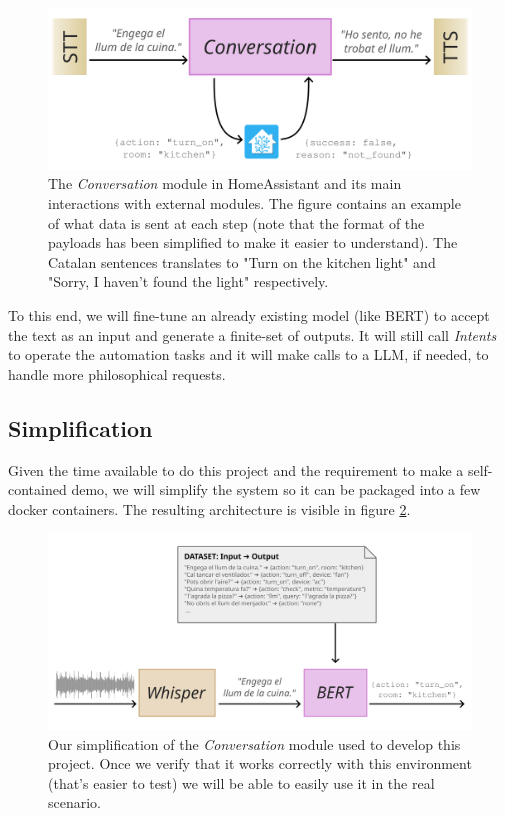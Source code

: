 \documentclass{article}
\begin{document}
\begin{figure}[H]
    \centering
    \includegraphics[width=0.95\linewidth]{drawing1.png}
    \caption{
    The \textit{Conversation} module in HomeAssistant and its main interactions with external modules. The figure contains an example of what data is sent at each step (note that the format of the payloads has been simplified to make it easier to understand). The Catalan sentences translates to "Turn on the kitchen light" and "Sorry, I haven't found the light" respectively.
    }
    \label{fig:our-pipeline-ideal}
\end{figure}

To this end, we will fine-tune an already existing model (like BERT) to accept the text as an input and generate a finite-set of outputs. It will still call \textit{Intents} to operate the automation tasks and it will make calls to a LLM, if needed, to handle more philosophical requests.

\subsection{Simplification}

Given the time available to do this project and the requirement to make a self-contained demo, we will simplify the system so it can be packaged into a few docker containers. The resulting
architecture is visible in figure \ref{fig:our-pipeline-real}.

\begin{figure}[H]
    \centering
    \includegraphics[width=\linewidth]{drawing2.png}
    \caption{
    Our simplification of the \textit{Conversation} module used to develop this project. Once we verify that it works correctly with this environment (that's easier to test) we will be able to easily use it in the real scenario.
    }
    \label{fig:our-pipeline-real}
\end{figure}
\end{document}
